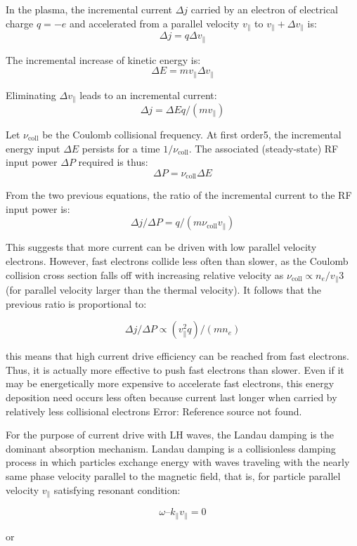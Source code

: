 In the plasma, the incremental current $\Delta j$ carried by an electron of electrical charge $q=-e$ and accelerated from a parallel velocity $v_\parallel$ to $v_\parallel + \Delta v_\parallel$ is:
$$\Delta j = q \Delta v_{\parallel}$$

The incremental increase of kinetic energy is:
$$\Delta E = m v_{\parallel} \Delta v_{\parallel}$$

Eliminating $\Delta v_{\parallel}$ leads to an incremental current: 
$$\Delta j = \Delta E q/(m v_{\parallel})$$ 

Let $\nu_\mathrm{coll}$ be the Coulomb collisional frequency. At first order5, the incremental energy input $\Delta E$ persists for a time $1/\nu_\mathrm{coll}$. The associated (steady-state) RF input power $\Delta P$ required is thus: 
$$\Delta P = \nu_\mathrm{coll} \Delta E$$ 

From the two previous equations, the ratio of the incremental current to the RF input power is:
$$\Delta j/ \Delta P = q / (m \nu_\mathrm{coll} v_{\parallel})$$

This suggests that more current can be driven with low parallel velocity electrons. However, fast electrons collide less often than slower, as the Coulomb collision cross section falls off with increasing relative velocity as $\nu_\mathrm{coll} \propto n_e/v_{\parallel}$3 (for parallel velocity larger than the thermal velocity). It follows that the previous ratio is proportional to: 

$$\Delta j/ \Delta P \propto (v_{\parallel}^2 q) / (m n_e)$$

this means that high current drive efficiency can be reached from fast electrons. Thus, it is actually more effective to push fast electrons than slower. Even if it may be energetically more expensive to accelerate fast electrons, this energy deposition need occurs less often because current last longer when carried by relatively less collisional electrons Error: Reference source not found. 

For the purpose of current drive with LH waves, the Landau damping is the dominant absorption mechanism. Landau damping is a collisionless damping process in which particles exchange energy with waves traveling with the nearly same phase velocity parallel to the magnetic field, that is, for particle parallel velocity $v_{\parallel}$ satisfying resonant condition:

$$\omega – k_{\parallel} v_{\parallel} = 0 $$ 

or 

